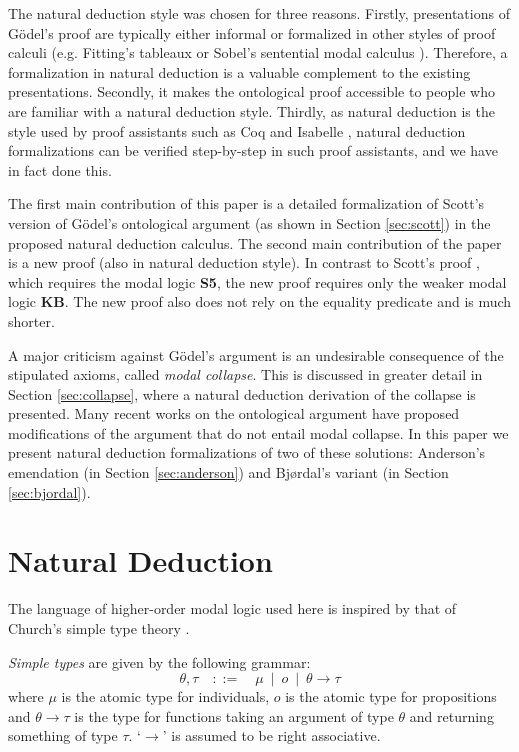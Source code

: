 \documentclass[smallextended]{svjour3}
\newcommand{\imp}{\rightarrow}
\begin{document}
The natural deduction style was chosen for three reasons. Firstly, presentations of G\"odel's proof are typically either informal or formalized in other styles of proof calculi (e.g. Fitting's tableaux \citep{fitting} or Sobel's sentential modal calculus \citep{sobel2}). Therefore, a formalization in natural deduction is a valuable complement to the existing presentations. Secondly, it makes the ontological proof accessible to people who are familiar with a natural deduction style. Thirdly, as natural deduction is the style used by proof assistants such as Coq \citep{coq} and Isabelle \citep{isabelle}, natural deduction formalizations can be verified step-by-step in such proof assistants, and we have in fact done this.

The first main contribution of this paper is a detailed formalization of Scott's version \citep{scott} of G\"odel's ontological argument \citep{Goedel} (as shown in Section \ref{sec:scott}) in the proposed natural deduction calculus. The second main contribution of the paper is a new proof (also in natural deduction style). In contrast to Scott's proof \citep{scott}, which requires the modal logic \textbf{S5}, the new proof requires only the weaker modal logic \textbf{KB}. The new proof also does not rely on the equality predicate and is much shorter.

A major criticism against G\"odel's argument is an undesirable consequence of the stipulated axioms, called \emph{modal collapse}. This is discussed in greater detail in Section \ref{sec:collapse}, where a natural deduction derivation of the collapse is presented. Many recent works on the ontological argument have proposed modifications of the argument that do not entail modal collapse. In this paper we present natural deduction formalizations of two of these solutions: Anderson's emendation (in Section \ref{sec:anderson}) and Bj{\o}rdal's variant (in Section \ref{sec:bjordal}).


\section{Natural Deduction}
\label{sec:calculus}

The language of higher-order modal logic used here is inspired by that of Church's simple type theory \citep{church}.

\begin{definition} \emph{Simple types} are given by the following grammar:
$$
  \theta,\tau \quad ::= \quad \mu \ \mid \ o \ \mid \ \theta \imp \tau
$$
where $\mu$ is the atomic type for individuals, $o$ is the atomic type for propositions and $\theta \imp \tau$ is the type for functions taking an argument of type $\theta$ and returning something of type $\tau$. `$\imp$' is assumed to be right associative.
\end{definition}
\end{document}
